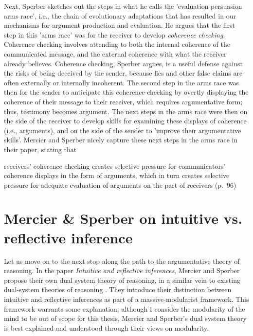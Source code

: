 Next, Sperber sketches out the steps in what he calls the 'evaluation-persuasion arms race', i.e., the chain of evolutionary adaptations that has resulted in our mechanisms for argument production and evaluation.
He argues that the first step in this 'arms race' was for the receiver to develop \emph{coherence checking}. Coherence checking involves attending to both the internal coherence of the communicated message, and the external coherence with what the receiver already believes. Coherence checking, Sperber argues, is a useful defense against the risks of being deceived by the sender, because lies and other false claims are often externally or internally incoherent.
The second step in the arms race was then for the sender to anticipate this coherence-checking by overtly displaying the coherence of their message to their receiver, which requires argumentative form; thus, testimony becomes argument.
The next steps in the arms race were then on the side of the receiver to develop skills for examining these displays of coherence (i.e., arguments), and on the side of the sender to 'improve their argumentative skills'.
Mercier and Sperber nicely capture these next steps in the arms race in their \citeyear{MS11} paper, stating that
\begin{quoting}
    receivers' coherence checking creates selective pressure for communicators' coherence displays in the form of arguments, which in turn creates selective pressure for adequate evaluation of arguments on the part of receivers
    \hfill (p.~96)
\end{quoting}


\section{Mercier \& Sperber on intuitive vs. reflective inference}
\label{sec:MS09}

Let us move on to the next stop along the path to the argumentative theory of reasoning. In the \citeyear{MS09} paper \emph{Intuitive and reflective inferences}, Mercier and Sperber propose their own dual system theory of reasoning, in a similar vein to existing dual-system theories of reasoning \citep{Sloman96, Evans03, Evans13, Kahneman11}.
They introduce their distinction between intuitive and reflective inferences as part of a massive-modularist framework. This framework warrants some explanation; although I consider the modularity of the mind to be out of scope for this thesis, Mercier and Sperber's dual system theory is best explained and understood through their views on modularity.

